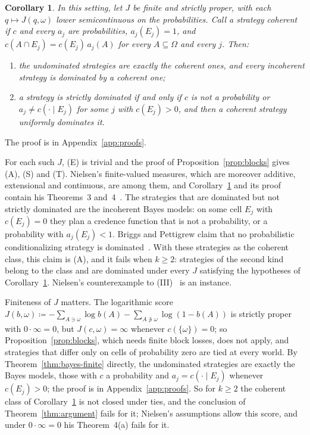 \documentclass[11pt]{article}
\newtheorem{corollary}[theorem]{Corollary}
\theoremstyle{definition}
\theoremstyle{remark}
\begin{document}
\begin{corollary}\label{cor:updating}
In this setting, let $J$ be finite and strictly proper, with each $q\mapsto J(q,\omega)$ lower semicontinuous on the probabilities. Call a strategy \emph{coherent} if $c$ and every $a_j$ are probabilities, $a_j(E_j)=1$, and $c(A\cap E_j)=c(E_j)\,a_j(A)$ for every $A\subseteq\Omega$ and every $j$. Then:
\begin{enumerate}[label=(\alph*)]
\item the undominated strategies are exactly the coherent ones, and every incoherent strategy is dominated by a coherent one;
\item a strategy is strictly dominated if and only if $c$ is not a probability or $a_j\ne c(\cdot\mid E_j)$ for some $j$ with $c(E_j)>0$, and then a coherent strategy uniformly dominates it.
\end{enumerate}
\end{corollary}
The proof is in Appendix~\ref{app:proofs}.

For each such $J$, (E) is trivial and the proof of Proposition~\ref{prop:blocks} gives (A), (S) and (T). Nielsen's finite-valued measures, which are moreover additive, extensional and continuous, are among them, and Corollary~\ref{cor:updating} and its proof contain his Theorems~3 and~4~\cite{Nielsen21}. The strategies that are dominated but not strictly dominated are the incoherent Bayes models: on some cell $E_j$ with $c(E_j)=0$ they plan a credence function that is not a probability, or a probability with $a_j(E_j)<1$. Briggs and Pettigrew claim that no probabilistic conditionalizing strategy is dominated~\cite[Theorem~1(III)]{BP20}. With these strategies as the coherent class, this claim is (A), and it fails when $k\ge2$: strategies of the second kind belong to the class and are dominated under every $J$ satisfying the hypotheses of Corollary~\ref{cor:updating}. Nielsen's counterexample to (III)~\cite{Nielsen21} is an instance.

Finiteness of $J$ matters. The logarithmic score $J(b,\omega)\coloneqq-\sum_{A\ni\omega}\log b(A)-\sum_{A\not\ni\omega}\log(1-b(A))$ is strictly proper with $0\cdot\infty=0$, but $J(c,\omega)=\infty$ whenever $c(\{\omega\})=0$; so Proposition~\ref{prop:blocks}, which needs finite block losses, does not apply, and strategies that differ only on cells of probability zero are tied at every world. By Theorem~\ref{thm:bayes-finite} directly, the undominated strategies are exactly the Bayes models, those with $c$ a probability and $a_j=c(\cdot\mid E_j)$ whenever $c(E_j)>0$; the proof is in Appendix~\ref{app:proofs}. So for $k\ge2$ the coherent class of Corollary~\ref{cor:updating} is not closed under ties, and the conclusion of Theorem~\ref{thm:argument} fails for it; Nielsen's assumptions allow this score, and under $0\cdot\infty=0$ his Theorem~4(a) fails for it.
\end{document}
